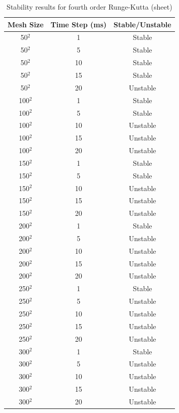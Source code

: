 \begin{table}[tp]
   \begin{minipage}{\textwidth}
      \begin{center}
         \begin{tabular}{|c|c|c|} \hline
           Mesh Size & Time Step (ms) & Stable/Unstable\\
           \hline
           50$^{2}$ & 1 & Stable\\ \hline
           50$^{2}$ & 5 & Stable\\ \hline
           50$^{2}$ & 10 & Stable\\ \hline
           50$^{2}$ & 15 & Stable\\ \hline
           50$^{2}$ & 20 & Unstable\\ \hline
           100$^{2}$ & 1 & Stable\\ \hline
           100$^{2}$ & 5 & Stable\\ \hline
           100$^{2}$ & 10 & Unstable\\ \hline
           100$^{2}$ & 15 & Unstable\\ \hline
           100$^{2}$ & 20 & Unstable\\ \hline           
           150$^{2}$ & 1 & Stable\\ \hline
           150$^{2}$ & 5 & Stable\\ \hline
           150$^{2}$ & 10 & Unstable\\ \hline
           150$^{2}$ & 15 & Unstable\\ \hline
           150$^{2}$ & 20 & Unstable\\ \hline           
           200$^{2}$ & 1 & Stable\\ \hline
           200$^{2}$ & 5 & Unstable\\ \hline
           200$^{2}$ & 10 & Unstable\\ \hline
           200$^{2}$ & 15 & Unstable\\ \hline
           200$^{2}$ & 20 & Unstable\\ \hline           
           250$^{2}$ & 1 & Stable\\ \hline
           250$^{2}$ & 5 & Unstable\\ \hline
           250$^{2}$ & 10 & Unstable\\ \hline
           250$^{2}$ & 15 & Unstable\\ \hline
           250$^{2}$ & 20 & Unstable\\ \hline           
           300$^{2}$ & 1 & Stable\\ \hline
           300$^{2}$ & 5 & Unstable\\ \hline
           300$^{2}$ & 10 & Unstable\\ \hline
           300$^{2}$ & 15 & Unstable\\ \hline
           300$^{2}$ & 20 & Unstable\\ \hline
         \end{tabular}
      \end{center}
   \end{minipage}
   \caption{Stability results for fourth order Runge-Kutta (sheet)}
   \label{tab:rk4 stability sheet}
\end{table}

